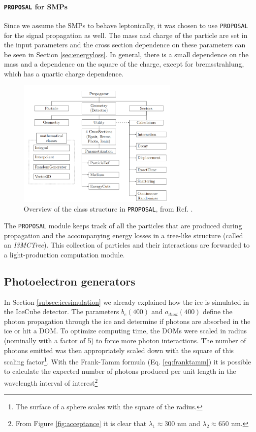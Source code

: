 \paragraph{\texttt{PROPOSAL} for SMPs}
Since we assume the SMPs to behave leptonically, it was chosen to use \texttt{PROPOSAL} for the signal propagation as well. The mass and charge of the particle are set in the input parameters and the cross section dependence on these parameters can be seen in Section \ref{sec:energyloss}. In general, there is a small dependence on the mass and a dependence on the square of the charge, except for bremsstrahlung, which has a quartic charge dependence.\\

\begin{figure}
\centering
\includegraphics[width=0.7\textwidth]{chapter6/img/proposal.png}
\caption{Overview of the class structure in \texttt{PROPOSAL}, from Ref. \cite{Dunsch:2018nsc}.}
\label{fig:proposal}
\end{figure}

\noindent The \texttt{PROPOSAL} module keeps track of all the particles that are produced during propagation and the accompanying energy losses in a tree-like structure (called an \textit{I3MCTree}). This collection of particles and their interactions are forwarded to a light-production computation module.

\subsection{Photoelectron generators}
In Section \ref{subsec:icesimulation} we already explained how the ice is simulated in the IceCube detector. The parameters $b_e(400)$ and $a_{dust}(400)$ define the photon propagation through the ice and determine if photons are absorbed in the ice or hit a DOM. To optimize computing time, the DOMs were scaled in radius (nominally with a factor of 5) to force more photon interactions. The number of photons emitted was then appropriately scaled down with the square of this scaling factor\footnote{The surface of a sphere scales with the square of the radius.}. With the Frank-Tamm formula (Eq. \ref{eq:franktamm}) it is possible to calculate the expected number of photons produced per unit length in the wavelength interval of interest\footnote{From Figure \ref{fig:acceptance} it is clear that $\lambda_1 \approx 300$ nm and $\lambda_2 \approx 650$ nm.}

